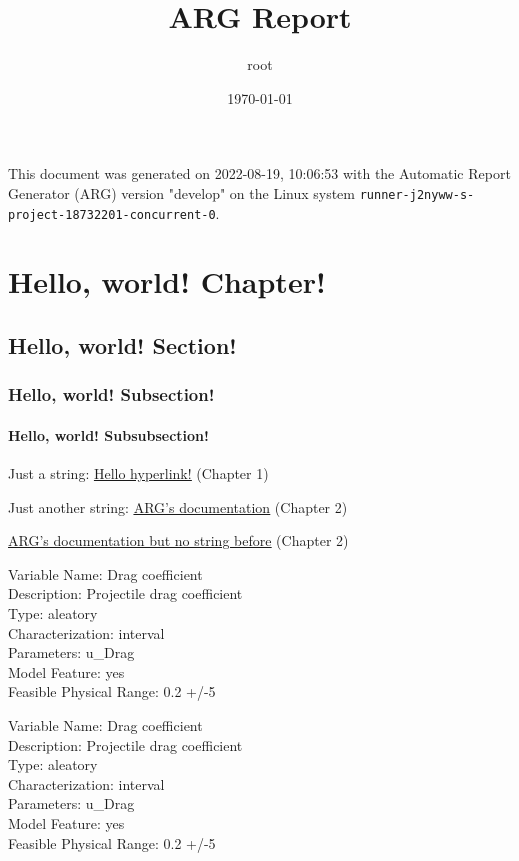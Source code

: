 \documentclass[letter,titlepage,oneside,11pt]{report}%
\title{\textbf{ARG Report}}%
\author{root}%
\date{\today}%
\begin{document}
%
\normalsize%
\maketitle%
\cleardoublepage%
This document was generated on 2022-08-19, 10:06:53 with the Automatic Report Generator (ARG) version "develop" on the Linux system \texttt{runner-j2nyww-s-project-18732201-concurrent-0}.%
\cleardoublepage%
\tableofcontents%
\listoffigures%
\listoftables%
\cleardoublepage%
\chapter{Hello, world! Chapter!}%
\par%
\section{Hello, world! Section!}%
\par%
\subsection{Hello, world! Subsection!}%
\par%
\subsubsection{Hello, world! Subsubsection!}%
\par%
\par%
Just a string: %
\href{expected/build_tests-hello_world-Report-LaTeX.pdf}{\underline{Hello hyperlink!}}%
 (Chapter 1)%
\\%
\par%
Just another string: %
\href{https://automaticreportgenerator.gitlab.io/arg/}{\underline{ARG's documentation}}%
 (Chapter 2)%
\\%
\par%
\href{https://automaticreportgenerator.gitlab.io/arg/}{\underline{ARG's documentation but no string before}}%
 (Chapter 2)%
\\%
\par%
Variable Name: Drag coefficient\\Description: Projectile drag coefficient\\Type: aleatory\\Characterization: interval\\Parameters: u_Drag\\Model Feature: yes\\Feasible Physical Range: 0.2 +/-5%
\par%
Variable Name: Drag coefficient\\Description: Projectile drag coefficient\\Type: aleatory\\Characterization: interval\\Parameters: u_Drag\\Model Feature: yes\\Feasible Physical Range: 0.2 +/-5%
\end{document}
